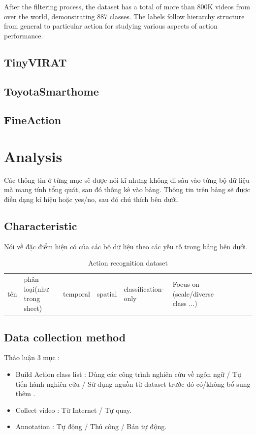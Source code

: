 \documentclass[a4paper]{article}
\begin{document}
After the filtering process, the dataset has a total of more than 800K videos from over the world, demonstrating 887 classes. The labels follow hierarchy structure from general to particular action for studying various aspects of action performance.
\subsection{TinyVIRAT}
\subsection{ToyotaSmarthome}
\subsection{FineAction}
\section{Analysis}
Các thông tin ở từng mục sẽ được nói kĩ nhưng không đi sâu vào từng bộ dữ liệu mà mang tính tổng quát, sau đó thống kê vào bảng. Thông tin trên bảng sẽ được điền dạng kí hiệu hoặc yes/no, sau đó chú thích bên dưới.

\subsection{Characteristic}
Nói về đặc điểm hiện có của các bộ dữ liệu theo các yếu tố trong bảng bên dưới.

\begin{table}[h]
	\centering
	\caption{Action recognition dataset}
	\begin{tabular}{l|l l l l l l l l l}
		\toprule
		tên & phân loại(như trong sheet) & temporal & spatial & classification-only & Focus on (scale/diverse class ...) \\
	\end{tabular}%
	\label{config1}
\end{table}%

\subsection{Data collection method}
Thảo luận 3 mục : 
\begin{itemize}
	\item Build Action class list : Dùng các công trình nghiên cứu về ngôn ngữ / Tự tiến hành nghiên cứu / Sử dụng nguồn từ dataset trước đó có/không bổ sung thêm .
	\item Collect video : Từ Internet / Tự quay.
	\item Annotation : Tự động / Thủ công / Bán tự động.
\end{itemize}
\end{document}
